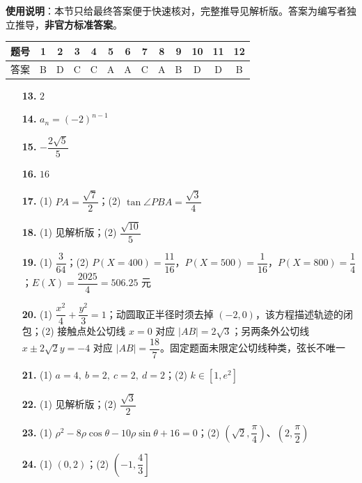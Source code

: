 
\begin{gknotice}
\textbf{使用说明}：本节只给最终答案便于快速核对，完整推导见解析版。答案为编写者独立推导，\textbf{非官方标准答案}。
\end{gknotice}

\begin{center}\begin{tabular}{ccccccccccccc}
\toprule
题号 & 1 & 2 & 3 & 4 & 5 & 6 & 7 & 8 & 9 & 10 & 11 & 12 \\
\midrule
答案 & B & D & C & C & A & A & C & A & B & D & D & B \\
\bottomrule
\end{tabular}\end{center}

\begin{itemize}[leftmargin=2.6em]
  \item[\textbf{13.}] $2$
  \item[\textbf{14.}] $a_n=(-2)^{n-1}$
  \item[\textbf{15.}] $-\dfrac{2\sqrt5}{5}$
  \item[\textbf{16.}] $16$
\end{itemize}

\begin{itemize}[leftmargin=2.6em]
  \item[\textbf{17.}] (1) $PA=\dfrac{\sqrt7}{2}$；(2) $\tan\angle PBA=\dfrac{\sqrt3}{4}$
  \item[\textbf{18.}] (1) 见解析版；(2) $\dfrac{\sqrt{10}}5$
  \item[\textbf{19.}] (1) $\dfrac3{64}$；(2) $P(X=400)=\dfrac{11}{16}$，$P(X=500)=\dfrac1{16}$，$P(X=800)=\dfrac14$；$E(X)=\dfrac{2025}4=506.25$ 元
  \item[\textbf{20.}] (1) $\dfrac{x^2}{4}+\dfrac{y^2}{3}=1$；动圆取正半径时须去掉 $(-2,0)$，该方程描述轨迹的闭包；(2) 接触点处公切线 $x=0$ 对应 $|AB|=2\sqrt3$；另两条外公切线 $x\pm2\sqrt2y=-4$ 对应 $|AB|=\dfrac{18}7$。固定题面未限定公切线种类，弦长不唯一
  \item[\textbf{21.}] (1) $a=4,\ b=2,\ c=2,\ d=2$；(2) $k\in[1,e^2]$
  \item[\textbf{22.}] (1) 见解析版；(2) $\dfrac{\sqrt3}{2}$
  \item[\textbf{23.}] (1) $\rho^2-8\rho\cos\theta-10\rho\sin\theta+16=0$；(2) $\left(\sqrt2,\dfrac\pi4\right)$、$\left(2,\dfrac\pi2\right)$
  \item[\textbf{24.}] (1) $(0,2)$；(2) $\left(-1,\dfrac43\right]$
\end{itemize}

